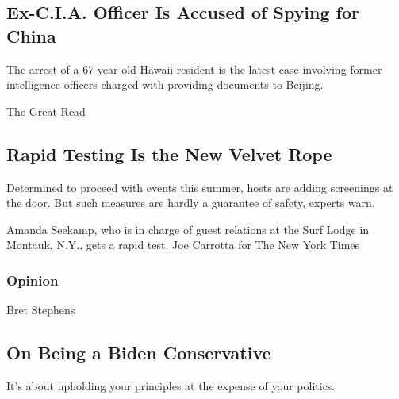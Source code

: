\href{/2020/08/17/us/politics/china-spying-alexander-yuk-ching-ma.html}{}

\hypertarget{ex-cia-officer-is-accused-of-spying-for-china}{%
\subsection{Ex-C.I.A. Officer Is Accused of Spying for
China}\label{ex-cia-officer-is-accused-of-spying-for-china}}

The arrest of a 67-year-old Hawaii resident is the latest case involving
former intelligence officers charged with providing documents to
Beijing.

\href{/2020/08/16/style/does-rapid-covid-testing-work-weddings-parties.html}{}

The Great Read

\hypertarget{rapid-testing-is-the-new-velvet-rope}{%
\subsection{Rapid Testing Is the New Velvet
Rope}\label{rapid-testing-is-the-new-velvet-rope}}

Determined to proceed with events this summer, hosts are adding
screenings at the door. But such measures are hardly a guarantee of
safety, experts warn.

\href{/2020/08/16/style/does-rapid-covid-testing-work-weddings-parties.html}{}

Amanda Seekamp, who is in charge of guest relations at the Surf Lodge in
Montauk, N.Y., gets a rapid test. Joe Carrotta for The New York Times

\href{https://www.nytimes.com/section/opinion?pagetype=Homepage\&action=click\&module=Opinion}{}

\hypertarget{opinion}{%
\subsubsection{Opinion}\label{opinion}}

\href{/2020/08/17/opinion/joe-biden-conservative-2020.html}{}

Bret Stephens

\hypertarget{on-being-a-biden-conservative}{%
\subsection{On Being a Biden
Conservative}\label{on-being-a-biden-conservative}}

It's about upholding your principles at the expense of your politics.

